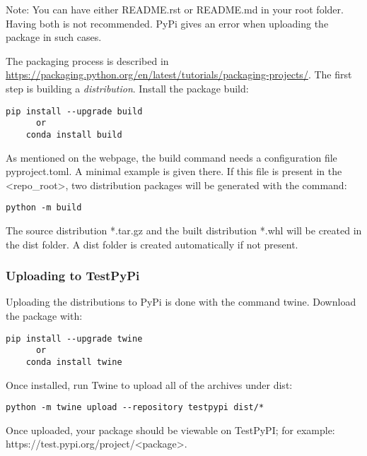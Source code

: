 Note: You can have either README.rst or README.md in your root folder. Having both is not recommended. PyPi gives an error when uploading the package in such cases.

The packaging process is described in \url{https://packaging.python.org/en/latest/tutorials/packaging-projects/}. The first step is building a \emph{distribution}. Install the package \textsf{build}:

\begin{lstlisting}[style=DOS]
    pip install --upgrade build
      or
    conda install build
\end{lstlisting}

As mentioned on the webpage, the \textsf{build} command needs a configuration file \textsf{pyproject.toml}. A minimal example is given there. If this file is present in the \textless repo\_root\textgreater, two distribution packages will be generated with the command:  

\begin{lstlisting}[style=DOS]
    python -m build	
\end{lstlisting}

The source distribution \textsf{*.tar.gz} and the built distribution \textsf{*.whl} will be created in the \textsf{dist} folder. A \textsf{dist} folder is created automatically if not present.

\subsubsection{Uploading to TestPyPi}

Uploading the distributions to PyPi is done with the command \textsf{twine}. Download the package with:

\begin{lstlisting}[style=DOS]
	pip install --upgrade twine
	  or
	conda install twine
\end{lstlisting}

Once installed, run Twine to upload all of the archives under dist:

\begin{lstlisting}[style=DOS]
    python -m twine upload --repository testpypi dist/*
\end{lstlisting}

Once uploaded, your package should be viewable on TestPyPI; for example: \\ 
https://test.pypi.org/project/\textless package\textgreater.

